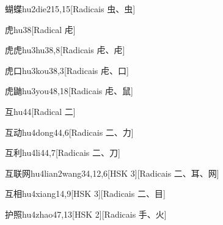 \begin{entry}{蝴蝶}{hu2die2}{15,15}[Radicais ⾍、⾍]
\end{entry}

\begin{entry}{虎}{hu3}{8}[Radical ⾌]
\end{entry}

\begin{entry}{虎虎}{hu3hu3}{8,8}[Radicais ⾌、⾌]
\end{entry}

\begin{entry}{虎口}{hu3kou3}{8,3}[Radicais ⾌、⼝]
\end{entry}

\begin{entry}{虎鼬}{hu3you4}{8,18}[Radicais ⾌、⿏]
\end{entry}

\begin{entry}{互}{hu4}{4}[Radical ⼆]
\end{entry}

\begin{entry}{互动}{hu4dong4}{4,6}[Radicais ⼆、⼒]
\end{entry}

\begin{entry}{互利}{hu4li4}{4,7}[Radicais ⼆、⼑]
\end{entry}

\begin{entry}{互联网}{hu4lian2wang3}{4,12,6}[HSK 3][Radicais ⼆、⽿、⽹]
\end{entry}

\begin{entry}{互相}{hu4xiang1}{4,9}[HSK 3][Radicais ⼆、⽬]
\end{entry}

\begin{entry}{护照}{hu4zhao4}{7,13}[HSK 2][Radicais ⼿、⽕]
\end{entry}

